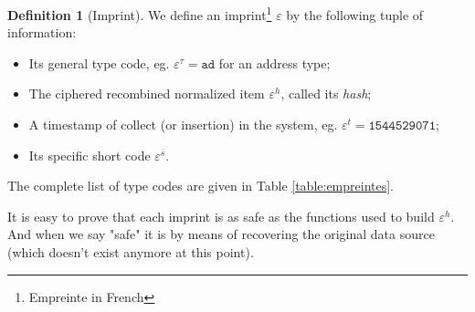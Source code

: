 \documentclass[twoside,twocolumn]{article}
\theoremstyle{definition}
\newtheorem{definition}{Definition}
\theoremstyle{remark}
\begin{document}
\begin{definition}[Imprint]
    \label{imprint}
    We define an imprint\footnote{Empreinte in French} $\varepsilon$ by the following tuple of information:
    \begin{itemize}
        \item Its general type code, eg. $\varepsilon^\tau = \texttt{ad}$ for an address type;
        \item The ciphered recombined normalized item $\varepsilon^h$, called its \emph{hash};
        \item A timestamp of collect (or insertion) in the system, eg. $\varepsilon^t = \texttt{1544529071}$;
        \item Its specific short code $\varepsilon^{\overline{s}}$.
    \end{itemize}

    The complete list of type codes are given in Table \ref{table:empreintes}.

    It is easy to prove that each imprint is as safe as the functions used to build $\varepsilon^h$.
    And when we say "safe" it is by means of recovering the original data source (which doesn't exist anymore at this point).
\end{definition}
\end{document}
